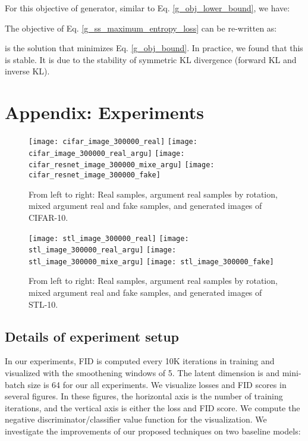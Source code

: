 \documentclass{article}
\begin{document}
%
 
For this objective of generator, similar to Eq. \ref{g_obj_lower_bound}, we have: 



The objective of Eq. \ref{g_ss_maximum_entropy_loss} can be re-written as:



 is the solution that minimizes Eq. \ref{g_obj_bound}. 
In practice, we found that this is stable. It is due to the stability of symmetric KL divergence (forward KL and inverse KL).




\section{Appendix: Experiments}
\label{appendix_b}



\begin{figure}
  \centering
\texttt{[image: cifar\_image\_300000\_real]}
  \texttt{[image: cifar\_image\_300000\_real\_argu]}
  \texttt{[image: cifar\_resnet\_image\_300000\_mixe\_argu]}
  \texttt{[image: cifar\_resnet\_image\_300000\_fake]}
  \caption{From left to right: Real samples, argument real samples by rotation, mixed argument real and fake samples, and generated images of CIFAR-10.}
  \label{cifar_resnet_samples}
\end{figure}

\begin{figure}
  \centering
\texttt{[image: stl\_image\_300000\_real]}
  \texttt{[image: stl\_image\_300000\_real\_argu]}
  \texttt{[image: stl\_image\_300000\_mixe\_argu]}
  \texttt{[image: stl\_image\_300000\_fake]}
  \caption{From left to right: Real samples, argument real samples by rotation, mixed argument real and fake samples, and generated images of STL-10.}
  \label{stl_resnet_samples}
\end{figure}

\subsection{Details of experiment setup}
\label{ablation_study_ld}

In our experiments, FID is computed every 10K iterations in training and visualized with the smoothening windows of 5. The latent dimension is  and mini-batch size is 64 for our all experiments. We visualize losses and FID scores in several figures. In these figures, the horizontal axis is the number of training iterations, and the vertical axis is either the loss and FID score. We compute the negative  discriminator/classifier value function for the visualization. We investigate the improvements of our proposed techniques on two baseline models:
\end{document}
